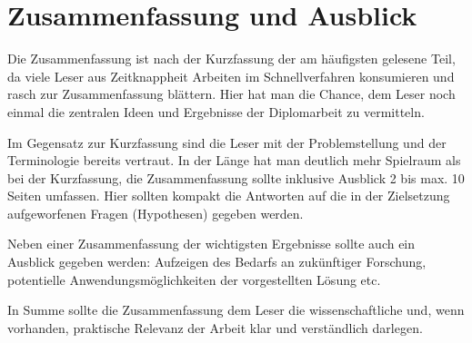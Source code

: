 \chapter{Zusammenfassung und Ausblick}
\label{sec:conclusion}

\makeatletter\ifthesis@masterthesis
Die Zusammenfassung ist nach der Kurzfassung der am häufigsten gelesene Teil, da viele Leser aus Zeitknappheit Arbeiten im Schnellverfahren konsumieren und rasch zur Zusammenfassung blättern. Hier hat man die Chance, dem Leser noch einmal die zentralen Ideen und Ergebnisse der Diplomarbeit zu vermitteln.

Im Gegensatz zur Kurzfassung sind die Leser mit der Problemstellung und der Terminologie bereits vertraut. In der Länge hat man deutlich mehr Spielraum als bei der Kurzfassung, die Zusammenfassung sollte inklusive Ausblick 2 bis max. 10 Seiten umfassen. Hier sollten kompakt die Antworten auf die in der Zielsetzung aufgeworfenen Fragen (Hypothesen) gegeben werden.

Neben einer Zusammenfassung der wichtigsten Ergebnisse sollte auch ein Ausblick gegeben werden: Aufzeigen des Bedarfs an zukünftiger Forschung, potentielle Anwendungsmöglichkeiten der vorgestellten Lösung etc.

In Summe sollte die Zusammenfassung dem Leser die wissenschaftliche und, wenn vorhanden, praktische Relevanz der Arbeit klar und verständlich darlegen.
\fi\makeatother
